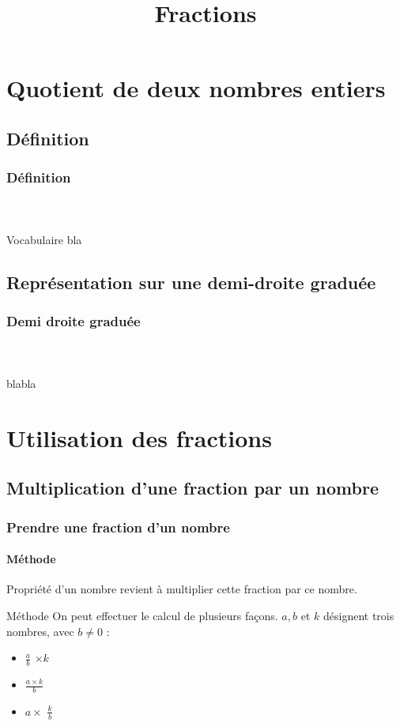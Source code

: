 \documentclass{beamer}
\title{Fractions}
\author{}\institute{}
\begin{document}
	
	
	
\begin{frame}
	\titlepage
\end{frame}

\section{Quotient de deux nombres entiers}

\subsection{Définition}


\begin{frame}
\frametitle{Définition}  
\framesubtitle{\ }	
	
\begin{block}{Vocabulaire}
	bla
\end{block}	

\end{frame}


\subsection{Représentation sur une demi-droite graduée}
\begin{frame}
	\frametitle{Demi droite graduée}  
	\framesubtitle{ \ }	
	
	blabla
	
\end{frame}


\section{Utilisation des fractions}

\subsection{Multiplication d'une fraction par un nombre}

\begin{frame}
	\frametitle{Prendre une fraction d'un nombre}  
	\framesubtitle{Méthode}	
	
	\begin{block}{Propriété}
		 d'un nombre revient à multiplier cette fraction par ce nombre.	
	\end{block}
	
	\begin{block}{Méthode}
		On peut effectuer le calcul de plusieurs façons.
		$a, b$ et $k$ désignent trois nombres, avec $b \neq 0$ :
		\begin{itemize}
			\item[\ ] {\Large $\frac{a}{b}$} $\times k$
			\item[ou] {\Large $\frac{a \times k}{b}$}
			\item[ou] $a \times $ {\Large $\frac{k}{b}$}
		\end{itemize}
	\end{block}
			
\end{frame}
\end{document}

